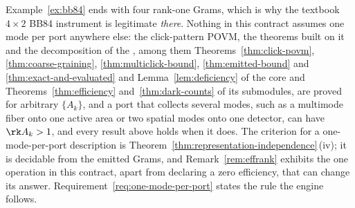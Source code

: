 
\begin{remark}\label{rem:rankone}
Example~\ref{ex:bb84} ends with four rank-one Grams, which is why the textbook
$4\times2$ BB84 instrument is legitimate \emph{there}. Nothing in this
contract assumes one mode per port anywhere else: the click-pattern POVM,
the theorems built on it and the decomposition of the ,
among them Theorems~\ref{thm:click-povm}, \ref{thm:coarse-graining},
\ref{thm:multiclick-bound}, \ref{thm:emitted-bound} and
\ref{thm:exact-and-evaluated} and Lemma~\ref{lem:deficiency} of the core
and Theorems~\ref{thm:efficiency} and~\ref{thm:dark-counts} of its
submodules, are proved for arbitrary $\{A_k\}$, and a port that collects
several modes, such as a multimode fiber onto one active area or two spatial
modes onto one detector, can have $\rk A_k>1$, and every result above holds
when it does. The criterion for a
one-mode-per-port description is Theorem~\ref{thm:representation-independence}\,(iv); it is decidable
from the emitted Grams, and Remark~\ref{rem:effrank} exhibits the one
operation in this contract, apart from declaring a zero efficiency, that can
change its answer.
Requirement~\ref{req:one-mode-per-port} states the rule the engine follows.
\end{remark}
